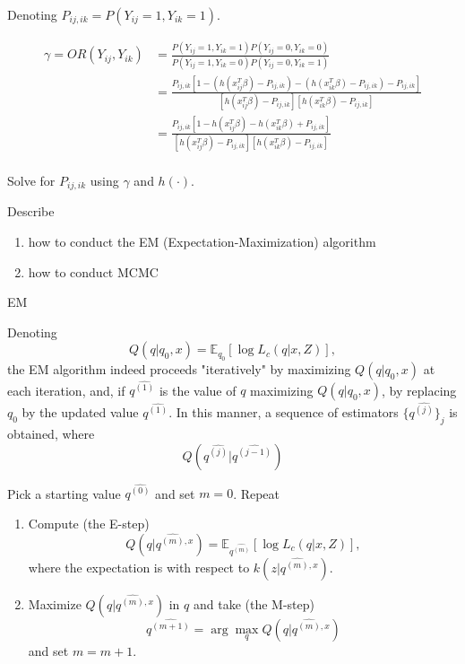 \documentclass[UTF8,a4paper,10pt]{article}
\begin{document}
Denoting \(P_{ij,ik} = P(Y_{ij} = 1,Y_{ik} = 1).\)


\begin{equation*}
  \begin{aligned}
    \gamma = OR(Y_{ij},Y_{ik}) &= \frac{P(Y_{ij} = 1,Y_{ik} = 1)P(Y_{ij} = 0,Y_{ik} = 0)}{P(Y_{ij} = 1,Y_{ik} = 0)P(Y_{ij} = 0,Y_{ik} = 1)}\\
    &= \frac{P_{ij,ik}[1-(h(x_{ij}^T\beta)-P_{ij,ik})-(h(x_{ik}^T\beta)-P_{ij,ik})-P_{ij,ik}]}{[h(x_{ij}^T\beta) -P_{ij,ik}][h(x_{ik}^T\beta)-P_{ij,ik}]}\\
    &= \frac{P_{ij,ik}[1-h(x_{ij}^T\beta)-h(x_{ik}^T\beta)+P_{ij,ik}]}{[h(x_{ij}^T\beta) -P_{ij,ik}][h(x_{ik}^T\beta)-P_{ij,ik}]}\\
  \end{aligned}
\end{equation*}

Solve for \(P_{ij,ik}\)
  using \(\gamma\) and \(h(\cdot)\).

\pagebreak
\begin{Problem}[]{}
  Describe
  \begin{enumerate}
    \item how to conduct the EM (Expectation-Maximization) algorithm
    \item how to conduct  MCMC
  \end{enumerate}
    
  \end{Problem}
 
  EM

  Denoting
  \[ Q(q|q_0, x) = \mathbb{E}_{q_0} \left[ \log L_c(q|x,Z) \right], \]
  the EM algorithm indeed proceeds "iteratively" by maximizing \(Q(q|q_0, x)\) at each iteration, and, if \(q^{\hat{(1)}}\) is the value of \(q\) maximizing \(Q(q|q_0, x)\), by replacing \(q_0\) by the updated value \(q^{\hat{(1)}}\). In this manner, a sequence of estimators \(\{q^{\hat{(j)}}\}_j\) is obtained, where
  \[ Q(q^{\hat{(j)}}|q^{\hat{(j-1)}}) \]

  Pick a starting value \(q^{\hat{(0)}}\) and set \(m = 0\).
Repeat
\begin{enumerate}
  \item Compute (the E-step) \[ Q(q|q^{\hat{(m)}, x}) = \mathbb{E}_{q^{\hat{(m)}}} \left[ \log L_c(q|x,Z) \right], \]where the expectation is with respect to \(k(z|q^{\hat{(m)}, x})\).
  \item Maximize \(Q(q|q^{\hat{(m)}, x})\) in \(q\) and take (the M-step)   \[ q^{\hat{(m+1)}} = \arg\max_q Q(q|q^{\hat{(m)}, x}) \] and set \(m = m+1\).
\end{enumerate}
\end{document}
